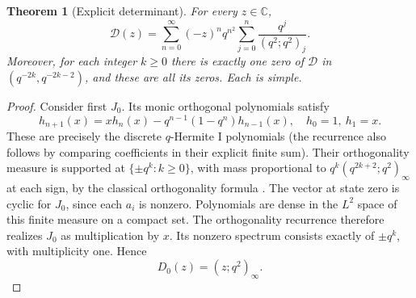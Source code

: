 \documentclass[11pt]{article}
\newtheorem{theorem}{Theorem}[section]
\theoremstyle{definition}\newtheorem{definition}[theorem]{Definition}
\begin{document}
\begin{theorem}[Explicit determinant]\label{thm:qseries}
For every $z\in\mathbb C$,
\begin{equation}\label{eq:qseries}
 \boxed{\mathcal D(z)=\sum_{n=0}^{\infty}(-z)^n q^{n^2}
                   \sum_{j=0}^{n}\frac{q^j}{(q^2;q^2)_j}.}
\end{equation}
Moreover, for each integer $k\geq0$ there is exactly one zero of $\mathcal D$ in $(q^{-2k},q^{-2k-2})$, and these are all its zeros. Each is simple.
\end{theorem}
\begin{proof}
Consider first $J_0$. Its monic orthogonal polynomials satisfy
\[
 h_{n+1}(x)=xh_n(x)-q^{n-1}(1-q^n)h_{n-1}(x),\quad h_0=1,\ h_1=x.
\]
These are precisely the discrete $q$-Hermite I polynomials (the recurrence also follows by comparing coefficients in their explicit finite sum). Their orthogonality measure is supported at $\{\pm q^k:k\geq0\}$, with mass proportional to $q^k(q^{2k+2};q^2)_\infty$ at each sign, by the classical orthogonality formula \cite[\S18.27(vii)]{DLMF}. The vector at state zero is cyclic for $J_0$, since each $a_i$ is nonzero. Polynomials are dense in the $L^2$ space of this finite measure on a compact set. The orthogonality recurrence therefore realizes $J_0$ as multiplication by $x$. Its nonzero spectrum consists exactly of $\pm q^k$, with multiplicity one. Hence
\begin{equation}\label{eq:D0}
 D_0(z)=(z;q^2)_\infty.
\end{equation}


\end{proof}
\end{document}
